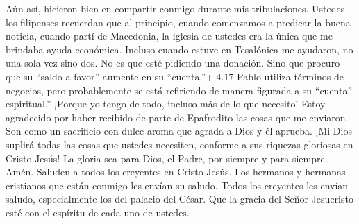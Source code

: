  Aún así, hicieron bien en compartir conmigo durante mis
tribulaciones.  Ustedes los filipenses recuerdan que al
principio, cuando comenzamos a predicar la buena noticia, cuando partí
de Macedonia, la iglesia de ustedes era la única que me brindaba ayuda
económica.  Incluso cuando estuve en Tesalónica me
ayudaron, no una sola vez sino dos.  No es que esté
pidiendo una donación. Sino que procuro que su ``saldo a favor'' aumente
en su ``cuenta.''+ 4.17 Pablo utiliza términos de negocios, pero
probablemente se está refiriendo de manera figurada a su ``cuenta''
espiritual.''  ¡Porque yo tengo de todo, incluso más de lo
que necesito! Estoy agradecido por haber recibido de parte de Epafrodito
las cosas que me enviaron. Son como un sacrificio con dulce aroma que
agrada a Dios y él aprueba.  ¡Mi Dios suplirá todas las
cosas que ustedes necesiten, conforme a sus riquezas gloriosas en Cristo
Jesús!  La gloria sea para Dios, el Padre, por siempre y
para siempre. Amén.  Saluden a todos los creyentes en
Cristo Jesús. Los hermanos y hermanas cristianos que están conmigo les
envían su saludo.  Todos los creyentes les envían saludo,
especialmente los del palacio del César.  Que la gracia del
Señor Jesucristo esté con el espíritu de cada uno de ustedes.

